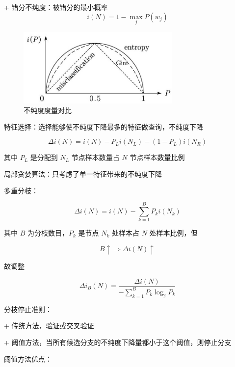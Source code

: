 \documentclass[openany,a4paper,12pt]{ctexbook}
\theoremstyle{kaiti}
\theoremstyle{normal}
\begin{document}
+ 错分不纯度：被错分的最小概率 
  \begin{equation}
  i\left(N \right)=1-\max_jP\left(w_j \right)
  \end{equation}

\begin{figure}
  \centering
  \includegraphics[width=8cm]{1627808735615-11.2.jpg}
  \caption{不纯度度量对比}
\end{figure}

特征选择：选择能够使不纯度下降最多的特征做查询，不纯度下降

\begin{equation}
\Delta i\left(N \right)=i\left(N \right)-P_Li\left(N_L \right)-\left(1-P_L \right)i\left(N_R \right)
\end{equation}

其中 $P_L$ 是分配到 $N_L$ 节点样本数量占 $N$ 节点样本数量比例

局部贪婪算法：只考虑了单一特征带来的不纯度下降

多重分枝：

\begin{equation}
\Delta i\left(N \right)=i\left(N \right)-\sum_{k=1}^{B}P_ki\left(N_k \right)
\end{equation}

其中 $B$ 为分枝数目，$P_k$ 是节点 $N_k$ 处样本占 $N$ 处样本比例，但

\begin{equation}
B\uparrow \Rightarrow \Delta i\left(N \right)\uparrow
\end{equation}

故调整

\begin{equation}
\Delta i_B\left(N \right)=
\frac{\Delta i\left(N \right)}{-\displaystyle\sum_{k=1}^{B}P_k\log_2P_k}
\end{equation}

分枝停止准则：

+ 传统方法，验证或交叉验证

+ 阈值方法，当所有候选分支的不纯度下降量都小于这个阈值，则停止分支

阈值方法优点：
\end{document}
